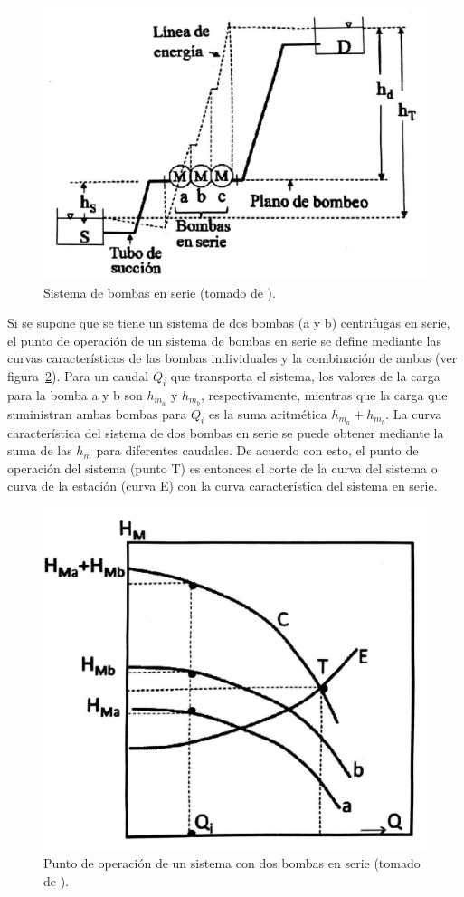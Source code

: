 \documentclass[11pt, oneside]{article}
\begin{document}
\begin{figure}[h]
\centering
\includegraphics[width=12cm]{./figs/bom22.jpeg}
\caption{Sistema de bombas en serie (tomado de \cite{agudelo2011mecanica}).} 
\label{bom22}
\end{figure}

Si se supone que se tiene un sistema de dos  bombas (a y b) centrifugas en serie, el punto de operaci\'on de un sistema de bombas en serie se define mediante las curvas caracter\'isticas de las bombas individuales y la combinaci\'on de ambas (ver figura~\ref{bom23}). Para un caudal $Q_i$ que transporta el sistema, los valores de la carga para la bomba a y b son $h_{m_a}$ y $h_{m_b}$, respectivamente, mientras que la carga que suministran ambas bombas para $Q_i$ es la suma aritm\'etica $h_{m_a}+h_{m_b}$. La curva caracter\'istica del sistema de dos bombas en serie se puede obtener mediante la suma de las $h_m$ para diferentes caudales. De acuerdo con esto, el punto de operaci\'on del sistema (punto T) es entonces el corte de la curva del sistema  o curva de la estaci\'on (curva E) con la curva caracter\'istica del sistema en serie.  

\begin{figure}[h]
\centering
\includegraphics[width=12cm]{./figs/bom23.jpeg}
\caption{Punto de operaci\'on de un sistema con dos bombas en serie (tomado de \cite{agudelo2011mecanica}).} 
\label{bom23}
\end{figure}
\end{document}
